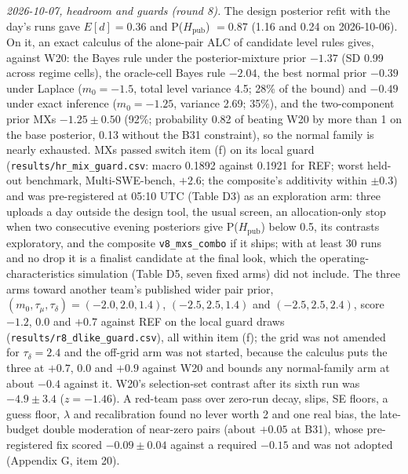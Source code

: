 \documentclass[
]{article}
\begin{document}
\emph{2026-10-07, headroom and guards (round 8).} The design posterior
refit with the day's runs gave \(E[d] = 0.36\) and
P(\(H_{\mathrm{pub}}\)) \(= 0.87\) (1.16 and 0.24 on 2026-10-06). On it,
an exact calculus of the alone-pair ALC of candidate level rules gives,
against W20: the Bayes rule under the posterior-mixture prior \(-1.37\)
(SD 0.99 across regime cells), the oracle-cell Bayes rule \(-2.04\), the
best normal prior \(-0.39\) under Laplace (\(m_0 = -1.5\), total level
variance 4.5; 28\% of the bound) and \(-0.49\) under exact inference
(\(m_0 = -1.25\), variance 2.69; 35\%), and the two-component prior MXs
\(-1.25 \pm 0.50\) (92\%; probability 0.82 of beating W20 by more than 1
on the base posterior, 0.13 without the B31 constraint), so the normal
family is nearly exhausted. MXs passed switch item (f) on its local
guard (\texttt{results/hr\_mix\_guard.csv}: macro 0.1892 against 0.1921
for REF; worst held-out benchmark, Multi-SWE-bench, \(+2.6\); the
composite's additivity within \(\pm 0.3\)) and was pre-registered at
05:10 UTC (Table D3) as an exploration arm: three uploads a day outside
the design tool, the usual screen, an allocation-only stop when two
consecutive evening posteriors give P(\(H_{\mathrm{pub}}\)) below 0.5,
its contrasts exploratory, and the composite \texttt{v8\_mxs\_combo} if
it ships; with at least 30 runs and no drop it is a finalist candidate
at the final look, which the operating-characteristics simulation (Table
D5, seven fixed arms) did not include. The three arms toward another
team's published wider pair prior, \((m_0, \tau_\mu, \tau_\delta) =
(-2.0, 2.0, 1.4)\), \((-2.5, 2.5, 1.4)\) and \((-2.5, 2.5, 2.4)\), score
\(-1.2\), 0.0 and \(+0.7\) against REF on the local guard draws
(\texttt{results/r8\_dlike\_guard.csv}), all within item (f); the grid
was not amended for \(\tau_\delta = 2.4\) and the off-grid arm was not
started, because the calculus puts the three at \(+0.7\), 0.0 and
\(+0.9\) against W20 and bounds any normal-family arm at about \(-0.4\)
against it. W20's selection-set contrast after its sixth run was
\(-4.9 \pm 3.4\) (\(z = -1.46\)). A red-team pass over zero-run decay,
slips, SE floors, a guess floor, \(\lambda\) and recalibration found no
lever worth 2 and one real bias, the late-budget double moderation of
near-zero pairs (about \(+0.05\) at B31), whose pre-registered fix
scored \(-0.09 \pm 0.04\) against a required \(-0.15\) and was not
adopted (Appendix G, item 20).
\end{document}
